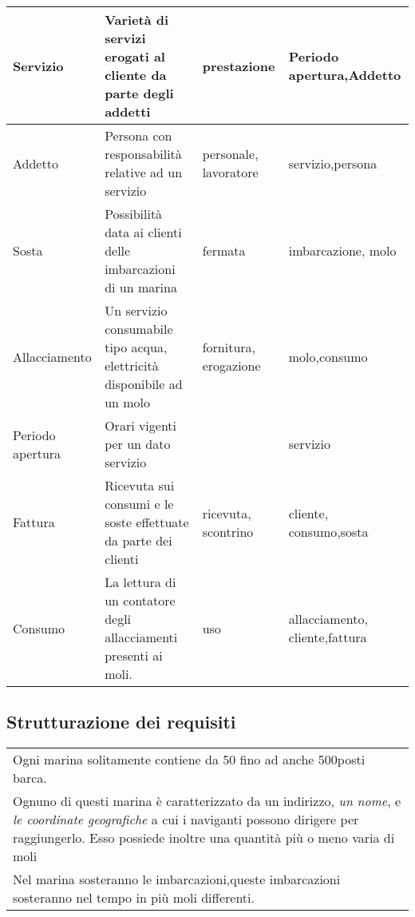 \begin{center}
\begin{tabularx}{\textwidth}{|p{2.4cm}|p{8cm}|p{2.4cm}|X|}
        \hline
        Servizio &Varietà di servizi erogati al cliente da parte degli addetti &prestazione&Periodo apertura,Addetto \\
        
        \hline
        Addetto & Persona con responsabilità relative ad un servizio & personale,
        lavoratore & servizio,persona \\
         
        \hline
        Sosta& Possibilità data ai clienti delle imbarcazioni di un marina  & fermata & imbarcazione,
        molo \\
        
        \hline
        Allacciamento & Un servizio consumabile tipo acqua, elettricità disponibile ad un molo& fornitura,
        erogazione & molo,consumo\\
        
        \hline
        Periodo 
        apertura & Orari vigenti per un dato servizio & &servizio\\
       
        \hline
        Fattura   &Ricevuta sui consumi e le soste effettuate da parte dei clienti &ricevuta,
        scontrino& cliente, consumo,sosta\\
      
        \hline
        Consumo & La lettura di un contatore degli allacciamenti presenti ai moli.& uso & allacciamento, cliente,fattura \\
        \hline
    \end{tabularx}
\end{center}

\subsection{Strutturazione dei requisiti}

\begin{center}
    \begin{tabularx}{\textwidth}{|X|}
        \hline
        \rowcolor{gray!30}
        \multicolumn{1}{|c|}{\textbf{Frasi relative a Marina}}\\
        \hline
        Ogni marina solitamente contiene da 50 fino ad anche 500posti barca. \\
        
        Ognuno di questi marina è caratterizzato da un indirizzo, \textit{un nome}, e \textit{le coordinate geografiche} a cui i naviganti possono dirigere per raggiungerlo. Esso possiede inoltre una quantità più o meno varia di moli\\
        
        Nel marina sosteranno le imbarcazioni,queste imbarcazioni sosteranno nel tempo in più moli differenti.\\
        \hline
    \end{tabularx}
\end{center}

